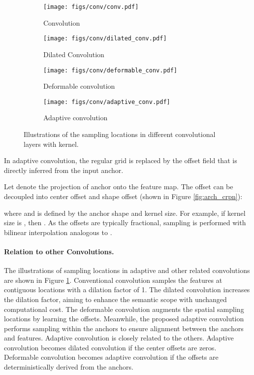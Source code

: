 \documentclass{article}
\begin{document}
	
	\begin{figure}[t]
		\centering
		\begin{subfigure}{0.245\columnwidth}
			\centering
			\texttt{[image: figs/conv/conv.pdf]}
			\caption*{Convolution}
		\end{subfigure}
		\begin{subfigure}{0.245\columnwidth}
			\centering
			\texttt{[image: figs/conv/dilated\_conv.pdf]}
			\caption*{Dilated Convolution}
		\end{subfigure}
		\begin{subfigure}{0.245\columnwidth}
			\centering
			\texttt{[image: figs/conv/deformable\_conv.pdf]}
			\caption*{Deformable convolution}
		\end{subfigure}
		\begin{subfigure}{0.245\columnwidth}
			\centering
			\texttt{[image: figs/conv/adaptive\_conv.pdf]}
			\caption*{Adaptive convolution}
		\end{subfigure}
		\caption{Illustrations of the sampling locations in different convolutional layers with  kernel.}
		\label{fig:convs}
	\end{figure}
	
	In adaptive convolution, the regular grid  is replaced by the offset field  that is directly inferred from the input anchor. 
	
	Let  denote the projection of anchor  onto the feature map. The offset  can be decoupled into center offset and shape offset (shown in Figure \ref{fig:arch_crpn}): 
	
	where  and  is defined by the anchor shape and kernel size. For example, if kernel size is , then . As the offsets are typically fractional, sampling is performed with bilinear interpolation analogous to \citep{Dai_2017_ICCV}. 
	
	\paragraph{Relation to other Convolutions. } The illustrations of sampling locations in adaptive and other related convolutions are shown in Figure \ref{fig:convs}. Conventional convolution samples the features at contiguous locations with a dilation factor of 1. The dilated convolution \citep{yu2015multi} increases the dilation factor, aiming to enhance the semantic scope with unchanged computational cost. The deformable convolution \citep{Dai_2017_ICCV} augments the spatial sampling locations by learning the offsets. Meanwhile, the proposed adaptive convolution performs sampling within the anchors to ensure alignment between the anchors and features. Adaptive convolution is closely related to the others. Adaptive convolution becomes dilated convolution if the center offsets are zeros. Deformable convolution becomes adaptive convolution if the offsets are deterministically derived from the anchors. 
	
\end{document}

